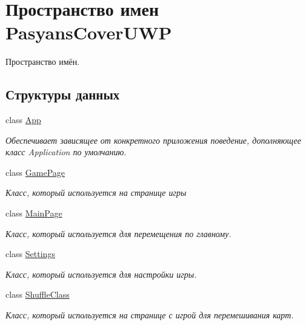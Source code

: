 \hypertarget{namespace_pasyans_cover_u_w_p}{}\section{Пространство имен Pasyans\+Cover\+U\+WP}
\label{namespace_pasyans_cover_u_w_p}


Пространство имён.  


\subsection*{Структуры данных}
\begin{DoxyCompactItemize}
\item 
class \hyperlink{class_pasyans_cover_u_w_p_1_1_app}{App}
\begin{DoxyCompactList}\small\item\em Обеспечивает зависящее от конкретного приложения поведение, дополняющее класс Application по умолчанию. \end{DoxyCompactList}\item 
class \hyperlink{class_pasyans_cover_u_w_p_1_1_game_page}{Game\+Page}
\begin{DoxyCompactList}\small\item\em Класс, который используется на странице игры \end{DoxyCompactList}\item 
class \hyperlink{class_pasyans_cover_u_w_p_1_1_main_page}{Main\+Page}
\begin{DoxyCompactList}\small\item\em Класс, который используется для перемещения по главному. \end{DoxyCompactList}\item 
class \hyperlink{class_pasyans_cover_u_w_p_1_1_settings}{Settings}
\begin{DoxyCompactList}\small\item\em Класс, который используется для настройки игры. \end{DoxyCompactList}\item 
class \hyperlink{class_pasyans_cover_u_w_p_1_1_shuffle_class}{Shuffle\+Class}
\begin{DoxyCompactList}\small\item\em Класс, который используется на странице с игрой для перемешивания карт. \end{DoxyCompactList}\end{DoxyCompactItemize}


